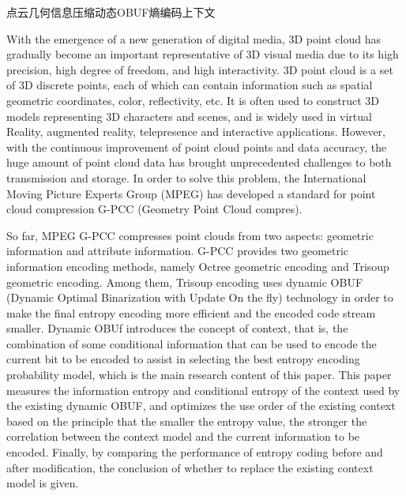 \begin{ckeywords}
    点云\quad 几何信息压缩\quad 动态OBUF\quad 熵编码\quad 上下文
\end{ckeywords}



\begin{eabstract}
    With the emergence of a new generation of digital media, 3D point cloud has gradually become an important representative of 3D visual media due to its high precision, high degree of freedom, and high interactivity. 3D point cloud is a set of 3D discrete points, each of which can contain information such as spatial geometric coordinates, color, reflectivity, etc. It is often used to construct 3D models representing 3D characters and scenes, and is widely used in virtual Reality, augmented reality, telepresence and interactive applications. However, with the continuous improvement of point cloud points and data accuracy, the huge amount of point cloud data has brought unprecedented challenges to both transmission and storage. In order to solve this problem, the International Moving Picture Experts Group (MPEG) has developed a standard for point cloud compression G-PCC (Geometry Point Cloud compres).

    So far, MPEG G-PCC compresses point clouds from two aspects: geometric information and attribute information. G-PCC provides two geometric information encoding methods, namely Octree geometric encoding and Trisoup geometric encoding. Among them, Trisoup encoding uses dynamic OBUF (Dynamic Optimal Binarization with Update On the fly) technology in order to make the final entropy encoding more efficient and the encoded code stream smaller. Dynamic OBUf introduces the concept of context, that is, the combination of some conditional information that can be used to encode the current bit to be encoded to assist in selecting the best entropy encoding probability model, which is the main research content of this paper. This paper measures the information entropy and conditional entropy of the context used by the existing dynamic OBUF, and optimizes the use order of the existing context based on the principle that the smaller the entropy value, the stronger the correlation between the context model and the current information to be encoded. Finally, by comparing the performance of entropy coding before and after modification, the conclusion of whether to replace the existing context model is given.


\end{eabstract}
